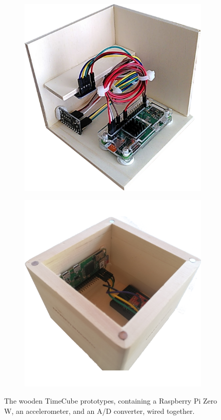 \begin{figure}
    \centering
    \begin{subfigure}{0.4\textwidth}
        \centering
        \includegraphics[width=0.95\linewidth]{timecube.png}
        \label{fig:timecube1}
    \end{subfigure}
    \begin{subfigure}{0.4\textwidth}
        \centering
        \includegraphics[width=0.95\linewidth]{timecube2.png}
        \label{fig:timecube2}
    \end{subfigure}
    \caption{The wooden TimeCube prototypes, containing a Raspberry Pi Zero W, an accelerometer, and an A/D converter, wired together.}
\end{figure}
